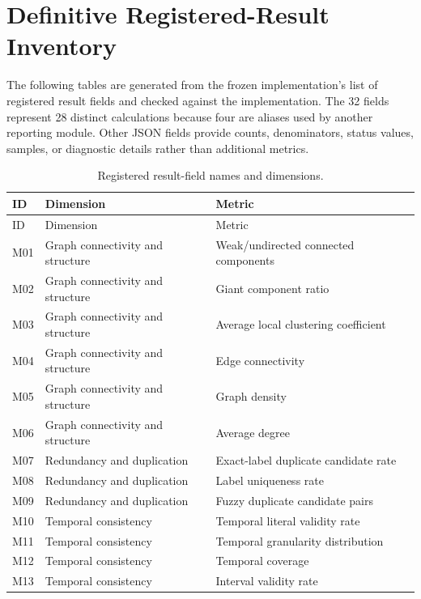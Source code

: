 \section{Definitive Registered-Result Inventory}
\label{app:core_metric_inventory}

The following tables are generated from the frozen implementation's list of registered result fields and checked against the implementation. The 32 fields represent 28 distinct calculations because four are aliases used by another reporting module. Other JSON fields provide counts, denominators, status values, samples, or diagnostic details rather than additional metrics.

\begingroup\scriptsize\setlength{\tabcolsep}{3pt}\setlength{\LTpre}{0.4em}\setlength{\LTpost}{0.4em}
\begin{longtable}{p{}p{}p{}}
\caption{Registered result-field names and dimensions.}\label{tab:core_metric_inventory_names}\\
\toprule ID & Dimension & Metric \\
\midrule\endfirsthead
\toprule ID & Dimension & Metric \\
\midrule\endhead
\bottomrule\endfoot
M01 & Graph connectivity and structure & Weak/undirected connected components \\
M02 & Graph connectivity and structure & Giant component ratio \\
M03 & Graph connectivity and structure & Average local clustering coefficient \\
M04 & Graph connectivity and structure & Edge connectivity \\
M05 & Graph connectivity and structure & Graph density \\
M06 & Graph connectivity and structure & Average degree \\
M07 & Redundancy and duplication & Exact-label duplicate candidate rate \\
M08 & Redundancy and duplication & Label uniqueness rate \\
M09 & Redundancy and duplication & Fuzzy duplicate candidate pairs \\
M10 & Temporal consistency & Temporal literal validity rate \\
M11 & Temporal consistency & Temporal granularity distribution \\
M12 & Temporal consistency & Temporal coverage \\
M13 & Temporal consistency & Interval validity rate \\

\end{longtable}
